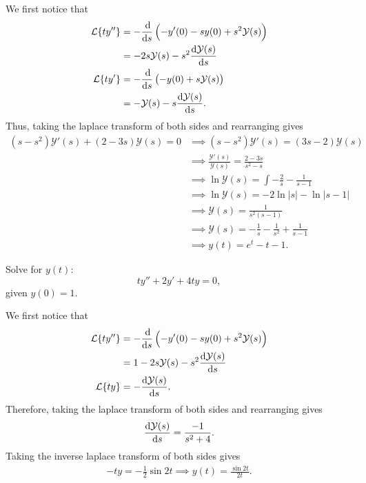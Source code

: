 \begin{soln}
    We first notice that
    \begin{align*}
        \mathcal{L}\{ty''\} &= -\frac{\dif}{\dif s} \left(-y'(0)-sy(0)+s^2\mathcal{Y}(s)\right) \\
                            &= -2s\mathcal{Y}(s)-s^2 \frac{\dif \mathcal{Y}(s)}{\dif s} \\
        \mathcal{L}\{ty'\} &= -\frac{\dif }{\dif s}\left(-y(0)+s\mathcal{Y}(s)\right) \\
                           &= -\mathcal{Y}(s)-s \frac{\dif \mathcal{Y}(s)}{\dif s}.
    \end{align*}
    Thus, taking the laplace transform of both sides and rearranging gives
    \begin{align*}
        (s-s^2)\mathcal{Y}'(s)+(2-3s)\mathcal{Y}(s) = 0 &\implies (s-s^2)\mathcal{Y}'(s) = (3s-2)\mathcal{Y}(s) \\
                                                        &\implies \frac{\mathcal{Y}'(s)}{\mathcal{Y}(s)} = \frac{2-3s}{s^2-s} \\
                                                        &\implies \ln \mathcal{Y}(s) = \int -\frac{2}{s}-\frac{1}{s-1} \\
                                                        &\implies \ln \mathcal{Y}(s) = -2\ln | s | - \ln | s - 1 | \\
                                                        &\implies \mathcal{Y}(s)  = \frac{1}{s^2(s-1)} \\
                                                        &\implies \mathcal{Y}(s) = -\frac{1}{s}-\frac{1}{s^2}+\frac{1}{s-1} \\
                                                        &\implies y(t) = e^{t}-t-1.
    \end{align*}
\end{soln}

\begin{example}
    Solve for $y(t)$:
    $$ty''+2y'+4ty=0,$$
    given $y(0) = 1$.
\end{example}
\begin{soln}
    We first notice that
    \begin{align*}
        \mathcal{L}\{ty''\} &= -\frac{\dif}{\dif s} \left(-y'(0)-sy(0)+s^2\mathcal{Y}(s)\right) \\
                            &= 1-2s\mathcal{Y}(s)-s^2 \frac{\dif \mathcal{Y}(s)}{\dif s} \\
        \mathcal{L}\{ty\} &= -\frac{\dif \mathcal{Y}(s)}{\dif s}.
    \end{align*}
    Therefore, taking the laplace transform of both sides and rearranging gives
    \begin{align*}
        \frac{\dif \mathcal{Y}(s)}{\dif s} = \frac{-1}{s^2+4}.
    \end{align*}
    Taking the inverse laplace transform of both sides gives
    \begin{align*}
        -ty = -\frac{1}{2}\sin 2t \implies y(t) = \frac{\sin 2t}{2t}.
    \end{align*}
\end{soln}
